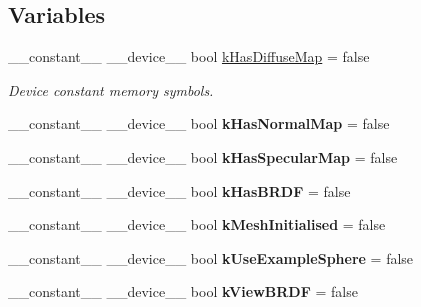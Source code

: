 \subsection*{Variables}
\begin{DoxyCompactItemize}
\item 
\hypertarget{PathTracer_8cu_a44cc78152f4052d45ae5357bbb4a4cdd}{\-\_\-\-\_\-constant\-\_\-\-\_\- \-\_\-\-\_\-device\-\_\-\-\_\- bool \hyperlink{PathTracer_8cu_a44cc78152f4052d45ae5357bbb4a4cdd}{k\-Has\-Diffuse\-Map} = false}\label{PathTracer_8cu_a44cc78152f4052d45ae5357bbb4a4cdd}

\begin{DoxyCompactList}\small\item\em Device constant memory symbols. \end{DoxyCompactList}\item 
\hypertarget{PathTracer_8cu_a2b1b58a89b1a273183e45f1a96a1f3cd}{\-\_\-\-\_\-constant\-\_\-\-\_\- \-\_\-\-\_\-device\-\_\-\-\_\- bool {\bfseries k\-Has\-Normal\-Map} = false}\label{PathTracer_8cu_a2b1b58a89b1a273183e45f1a96a1f3cd}

\item 
\hypertarget{PathTracer_8cu_a728ffb705f8175362e6d93c8d91bf2b5}{\-\_\-\-\_\-constant\-\_\-\-\_\- \-\_\-\-\_\-device\-\_\-\-\_\- bool {\bfseries k\-Has\-Specular\-Map} = false}\label{PathTracer_8cu_a728ffb705f8175362e6d93c8d91bf2b5}

\item 
\hypertarget{PathTracer_8cu_ab1e9e933b9ff184d8c63237b03462c21}{\-\_\-\-\_\-constant\-\_\-\-\_\- \-\_\-\-\_\-device\-\_\-\-\_\- bool {\bfseries k\-Has\-B\-R\-D\-F} = false}\label{PathTracer_8cu_ab1e9e933b9ff184d8c63237b03462c21}

\item 
\hypertarget{PathTracer_8cu_ae756e7197857f67fbed551afe1d55ecb}{\-\_\-\-\_\-constant\-\_\-\-\_\- \-\_\-\-\_\-device\-\_\-\-\_\- bool {\bfseries k\-Mesh\-Initialised} = false}\label{PathTracer_8cu_ae756e7197857f67fbed551afe1d55ecb}

\item 
\hypertarget{PathTracer_8cu_a7991d1e30454fd1b671ea2d3f52aec30}{\-\_\-\-\_\-constant\-\_\-\-\_\- \-\_\-\-\_\-device\-\_\-\-\_\- bool {\bfseries k\-Use\-Example\-Sphere} = false}\label{PathTracer_8cu_a7991d1e30454fd1b671ea2d3f52aec30}

\item 
\hypertarget{PathTracer_8cu_a31c3c62a28c62f6b2d6e8efb4eb2f56f}{\-\_\-\-\_\-constant\-\_\-\-\_\- \-\_\-\-\_\-device\-\_\-\-\_\- bool {\bfseries k\-View\-B\-R\-D\-F} = false}\label{PathTracer_8cu_a31c3c62a28c62f6b2d6e8efb4eb2f56f}


\end{DoxyCompactItemize}
